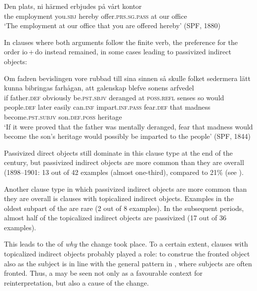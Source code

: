 \documentclass[output=paper]{langscibook}
\begin{document}
\ea%
    \label{ex:falk:24}
\gll Den    plats,        ni        härmed  erbjudes          på  vårt  kontor\\
    the    employment  you.\textsc{sbj}  hereby    offer\textsc{.prs.sg.pass}    at  our  office\\
\glt ‘The employment at our office that you are offered hereby’ (SPF, 1880)
\z


In clauses where both arguments follow the finite verb, the preference for the order io\,+\,do instead remained, in some cases leading to passivized indirect objects:

\ea%
    \label{ex:falk:25}
\gll Om  fadren    bevislingen    vore            rubbad    till    sina      sinnen  så skulle folket      sedermera  lätt      kunna    bibringas    farhågan,  att galenskap blefve              sonens          arfvedel\\
    if    father\textsc{.def}  obviously      be.\textsc{pst.sbjv}    deranged  at    \textsc{poss}.\textsc{refl}  senses  so         would people.\textsc{def}   later        easily    can.\textsc{inf}    impart.\textsc{inf.pass}  fear.\textsc{def}    that         madness   become.\textsc{pst.subjv}  son.\textsc{def.poss}  heritage  \\
\glt ‘If it were proved that the father was mentally deranged, fear that madness would become the son’s heritage would possibly be imparted to the people’ (SPF, 1844)
\z



Passivized direct objects still dominate in this clause type at the end of the century, but passivized indirect objects are more common than they are overall (1898–1901: 13 out of 42 examples (almost one-third), compared to 21\% (see ).


Another clause type in which passivized indirect objects are more common than they are overall is clauses with topicalized indirect objects. Examples in the oldest subpart of the  are rare (2 out of 8 examples). In the subsequent periods, almost half of the topicalized indirect objects are passivized (17 out of 36 examples).



This leads to the  of \textit{why} the change took place. To a certain extent, clauses with topicalized indirect objects probably played a role: to construe the fronted object also as the subject is in line with the general pattern in , where subjects are often fronted. Thus, a  may be seen not only as a favourable context for reinterpretation, but also a cause of the change.
\end{document}
